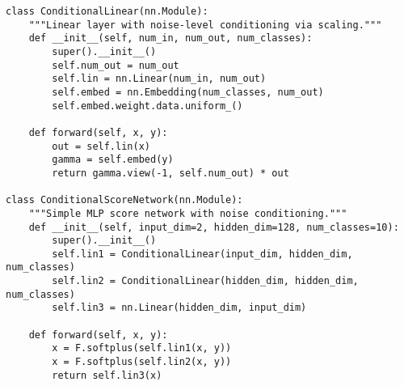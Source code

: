 \documentclass[11pt]{article}
\theoremstyle{definition}
\begin{document}
\begin{lstlisting}[style=py,caption={Conditional neural network architecture}]
class ConditionalLinear(nn.Module):
    """Linear layer with noise-level conditioning via scaling."""
    def __init__(self, num_in, num_out, num_classes):
        super().__init__()
        self.num_out = num_out
        self.lin = nn.Linear(num_in, num_out)
        self.embed = nn.Embedding(num_classes, num_out)
        self.embed.weight.data.uniform_()
    
    def forward(self, x, y):
        out = self.lin(x)
        gamma = self.embed(y)
        return gamma.view(-1, self.num_out) * out

class ConditionalScoreNetwork(nn.Module):
    """Simple MLP score network with noise conditioning."""
    def __init__(self, input_dim=2, hidden_dim=128, num_classes=10):
        super().__init__()
        self.lin1 = ConditionalLinear(input_dim, hidden_dim, num_classes)
        self.lin2 = ConditionalLinear(hidden_dim, hidden_dim, num_classes)
        self.lin3 = nn.Linear(hidden_dim, input_dim)
    
    def forward(self, x, y):
        x = F.softplus(self.lin1(x, y))
        x = F.softplus(self.lin2(x, y))
        return self.lin3(x)
\end{lstlisting}
\end{document}
